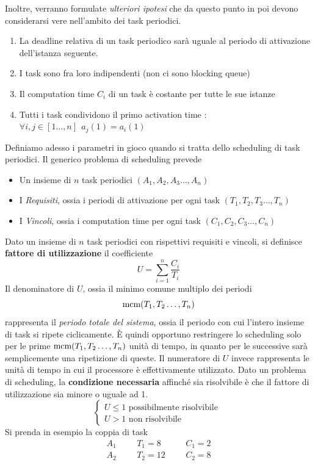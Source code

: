 \documentclass[10pt, letterpaper]{report}
\begin{document}
Inoltre, verranno formulate \textit{ulteriori ipotesi} che da questo punto in poi devono considerarsi vere 
nell'ambito dei task periodici.\begin{enumerate}
    \item La deadline relativa di un task periodico sarà uguale al periodo di attivazione dell'istanza seguente.
    \item I task sono fra loro indipendenti (non ci sono blocking queue)
    \item Il computation time $C_i$ di un task è costante per tutte le sue istanze 
    \item Tutti i task condividono il primo activation time : $\forall i,j\in[1\dots, n] \ \ a_j(1)=a_i(1)$
\end{enumerate}
Definiamo adesso i parametri in gioco quando si tratta dello scheduling di task periodici. Il generico problema 
di scheduling prevede \begin{itemize}
    \item Un insieme di $n$ task periodici $(A_1,A_2,A_3\dots,A_n)$ 
    \item I \textit{Requisiti}, ossia i periodi di attivazione per ogni task $(T_1,T_2,T_3\dots,T_n)$
    \item I \textit{Vincoli}, ossia i computation time per ogni task $(C_1,C_2,C_3\dots,C_n)$
\end{itemize}
 Dato un insieme di $n$ task periodici con rispettivi requisiti e vincoli, si definisce 
\textbf{fattore di utilizzazione} il coefficiente $$ 
U=\sum_{i=1}^n\frac{C_i}{T_i}
$$
Il denominatore di $U$, ossia il minimo comune multiplo dei periodi 
$$ {\text{mcm}}(T_1,T_2\dots,T_n)$$
rappresenta il \textit{periodo totale del sistema}, ossia il periodo con cui l'intero insieme 
di task si ripete ciclicamente. È quindi opportuno restringere lo scheduling solo per le 
prime ${\text{mcm}}(T_1,T_2\dots,T_n)$ unità di tempo, in quanto per le successive sarà semplicemente 
una ripetizione di queste. Il numeratore di $U$ invece rappresenta le unità di tempo in cui 
il processore è effettivamente utilizzato.\acc 
Dato un problema di scheduling, la \textbf{condizione necessaria} affinché sia risolvibile è che 
il fattore di utilizzazione sia minore o uguale ad 1. $$ \begin{cases}
    U\le 1 \text{ possibilmente risolvibile }\\ 
    U>1 \text{ non risolvibile}
\end{cases}$$
Si prenda in esempio la coppia di task $$ 
\begin{matrix}
    A_1 & & & T_1=8 & & & C_1 =2\\ 
    A_2 & & & T_2=12 & & & C_2=8
\end{matrix}
$$
\end{document}
